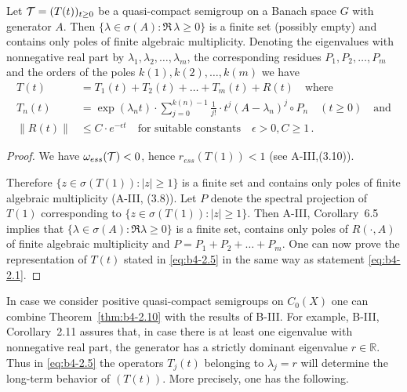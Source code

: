 \begin{theorem}\label{thm:b4-2.10}
	Let $\mathcal{T} = (T(t))_{t \geq 0}$ be a quasi-compact semigroup on a Banach space $G$ with generator $A$. 
    Then $\{\lambda \in \sigma(A) \colon \Re\,\lambda \geq 0\}$ is a finite set (possibly empty) and contains only poles of finite algebraic multiplicity. 
    Denoting the eigenvalues with nonnegative real part by $\lambda_1,\lambda_2, \ldots ,\lambda_m$, the corresponding residues $P_1,P_2, \ldots ,P_m$ and the orders of the poles $k(1),k(2), \ldots, k(m)$ we have
	\begin{equation}\label{eq:b4-2.5}
		\begin{aligned}
		T(t) &= T_1(t) + T_2(t) + \ldots + T_m(t) + R(t) \quad \text{where}\\
		T_n(t) &= \exp(\lambda_nt) \cdot \sum_{j=0}^{k(n)-1} \frac{1}{j!} \cdot t^j (A - \lambda_n)^j \circ P_n \quad (t \geq 0) \quad \text{and}\\
		\|R(t)\| &\leq C \cdot e^{-\epsilon t} \quad \text{for suitable constants} \quad \epsilon > 0, C \geq 1\,.		
		\end{aligned}
	\end{equation}
\end{theorem}
\begin{proof} We have $\omega_{ess}(\mathcal{T}) < 0$, hence $r_{ess}(T(1)) < 1$ (see A-III,(3.10)).

Therefore $\{z \in \sigma(T(1)) \colon |z| \geq 1\}$ is a finite set and contains only poles of finite algebraic multiplicity (\cf A-III, (3.8)). 
Let $P$ denote the spectral projection of $T(1)$ corresponding to $\{z \in \sigma(T(1))\colon |z| \geq 1\}$. 
Then A-III, Corollary~6.5 implies that $\{\lambda \in \sigma(A) \colon \Re  \lambda \geq 0\}$ is a finite set, contains only poles of $R(\cdot,A)$ of finite algebraic multiplicity and $P = P_1+P_2+ \ldots +P_m$. 
One can now prove the representation of $T(t)$ stated in \eqref{eq:b4-2.5} in the same way as statement \eqref{eq:b4-2.1}.
\end{proof}
In case we consider positive quasi-compact semigroups on $C_{0}(X)$ one can combine Theorem~\ref{thm:b4-2.10} with the results of B-III. 
For example, B-III, Corollary~2.11 assures that, in case there is at least one eigenvalue with nonnegative real part, the generator has a strictly dominant eigenvalue $r \in \mathbb{R}$. 
Thus in \eqref{eq:b4-2.5} the operators $T_j(t)$ belonging to $\lambda_j = r$ will determine the long-term behavior of $(T(t))$. More precisely, one has the following.
